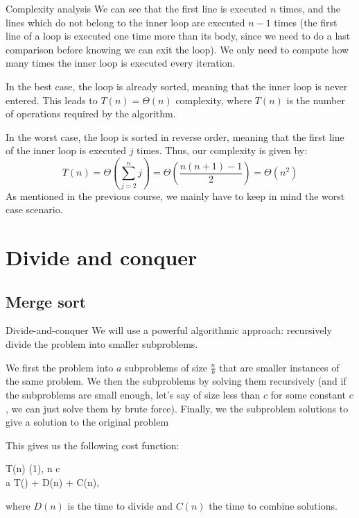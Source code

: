 \documentclass[a4paper]{article}
\begin{document}
\begin{parag}{Complexity analysis}
    We can see that the first line is executed $n$ times, and the lines which do not belong to the inner loop are executed $n-1$ times (the first line of a loop is executed one time more than its body, since we need to do a last comparison before knowing we can exit the loop). We only need to compute how many times the inner loop is executed every iteration.

    In the best case, the loop is already sorted, meaning that the inner loop is never entered. This leads to $T\left(n\right) = \Theta\left(n\right)$ complexity, where $T\left(n\right)$ is the number of operations required by the algorithm.

    In the worst case, the loop is sorted in reverse order, meaning that the first line of the inner loop is executed $j$ times. Thus, our complexity is given by:
    \[T\left(n\right) = \Theta\left(\sum_{j=2}^{n} j\right) = \Theta\left(\frac{n\left(n+1\right) - 1}{2}\right) = \Theta\left(n^2\right)\]
    As mentioned in the previous course, we mainly have to keep in mind the worst case scenario.
\end{parag}

\section{Divide and conquer}
\subsection{Merge sort}
\begin{parag}{Divide-and-conquer}
    We will use a powerful algorithmic approach: recursively divide the problem into smaller subproblems.

    We first  the problem into $a$ subproblems of size $\frac{n}{b}$ that are smaller instances of the same problem. We then  the subproblems by solving them recursively (and if the subproblems are small enough, let's say of size less than $c$ for some constant $c$, we can just solve them by brute force). Finally, we  the subproblem solutions to give a solution to the original
problem

    This gives us the following cost function:
    \begin{functionbypart}{T\left(n\right)}
        \Theta\left(1\right), \mathspace {} n \leq c \\
        a T\left(\right) + D\left(n\right) + C\left(n\right), \mathspace {}
    \end{functionbypart}
    where $D\left(n\right)$ is the time to divide and $C\left(n\right)$ the time to combine solutions.
\end{parag}
\end{document}
